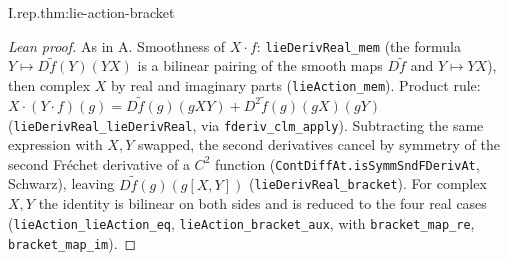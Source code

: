 \begin{theorem}
\end{theorem}
\begin{tfformal}{I.rep.thm:lie-action-bracket}
\end{tfformal}
\begin{proof}[Lean proof]
As in A. Smoothness of $X\cdot f$: \texttt{lieDerivReal\_mem} (the formula $Y\mapsto D\tilde f(Y)(YX)$ is a bilinear pairing of the smooth maps $D\tilde f$ and $Y\mapsto YX$), then complex $X$ by real and imaginary parts (\texttt{lieAction\_mem}). Product rule: $X\cdot(Y\cdot f)(g)=D\tilde f(g)(gXY)+D^2\tilde f(g)(gX)(gY)$ (\texttt{lieDerivReal\_lieDerivReal}, via \texttt{fderiv\_clm\_apply}). Subtracting the same expression with $X,Y$ swapped, the second derivatives cancel by symmetry of the second Fr\'echet derivative of a $C^2$ function (\texttt{ContDiffAt.isSymmSndFDerivAt}, Schwarz), leaving $D\tilde f(g)(g[X,Y])$ (\texttt{lieDerivReal\_bracket}). For complex $X,Y$ the identity is bilinear on both sides and is reduced to the four real cases (\texttt{lieAction\_lieAction\_eq}, \texttt{lieAction\_bracket\_aux}, with \texttt{bracket\_map\_re}, \texttt{bracket\_map\_im}).
\end{proof}


